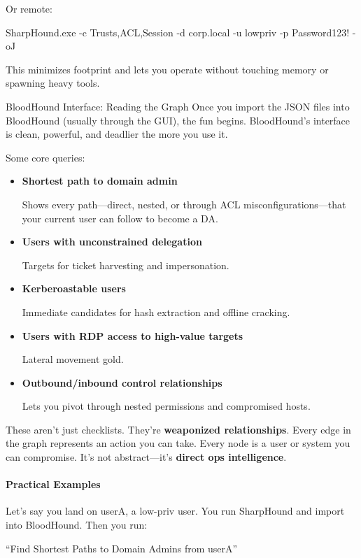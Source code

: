 Or remote:

SharpHound.exe -c Trusts,ACL,Session -d corp.local -u lowpriv -p Password123! -oJ

This minimizes footprint and lets you operate without touching memory or spawning heavy tools.

BloodHound Interface: Reading the Graph
Once you import the JSON files into BloodHound (usually through the GUI), the fun begins. BloodHound’s interface is clean, powerful, and deadlier the more you use it.

Some core queries:

\begin{itemize}
    \item \textbf{Shortest path to domain admin}

 Shows every path—direct, nested, or through ACL misconfigurations—that your current user can follow to become a DA.

    \item \textbf{Users with unconstrained delegation}

Targets for ticket harvesting and impersonation.

    \item \textbf{Kerberoastable users}

Immediate candidates for hash extraction and offline cracking.

    \item \textbf{Users with RDP access to high-value targets}

Lateral movement gold.

    \item \textbf{Outbound/inbound control relationships}

Lets you pivot through nested permissions and compromised hosts.

\end{itemize}
These aren’t just checklists. They’re \textbf{weaponized relationships}. Every edge in the graph represents an action you can take. Every node is a user or system you can compromise. It’s not abstract—it’s \textbf{direct ops intelligence}.

\paragraph{\textbf{   Practical Examples}}

Let’s say you land on userA, a low-priv user. You run SharpHound and import into BloodHound. Then you run:

“Find Shortest Paths to Domain Admins from userA”

